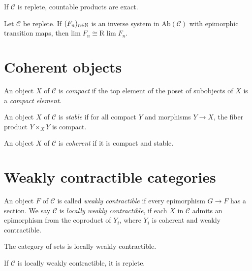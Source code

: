 \begin{proposition}
    If $\mathcal{C}$ is replete, countable products are exact.
    \label{prop:replete-products-exact}
\end{proposition}

\begin{proposition}
    Let $\mathcal{C}$ be replete.
    If $(F_n)_{n \in \mathbb{N}}$ is an inverse system in $\mathrm{Ab}(\mathcal{C})$ with
    epimorphic transition maps, then $\mathrm{lim} \; F_n \cong \mathrm{R}\; \mathrm{lim} \; F_n$.
    \label{prop:lim-exact-replete}
\end{proposition}

\section{Coherent objects}

\begin{definition}
    An object $X$ of $\mathcal{C}$ is \emph{compact} if the top element of the poset
    of subobjects of $X$ is a \emph{compact element}.
\end{definition}

\begin{definition}
    An object $X$ of $\mathcal{C}$ is \emph{stable} if for all compact $Y$ and morphisms $Y \to X$,
    the fiber product $Y \times_{X} Y$ is compact.
\end{definition}

\begin{definition}
    An object $X$ of $\mathcal{C}$ is \emph{coherent} if it is compact and stable.
    \label{def:coherent-object}
\end{definition}

\section{Weakly contractible categories}

\begin{definition}
    An object $F$ of $\mathcal{C}$ is called \emph{weakly contractible} if every epimorphism
    $G \to F$ has a section. We say $\mathcal{C}$ is \emph{locally weakly contractible},
    if each $X$ in $\mathcal{C}$ admits an epimorphism from the coproduct of $Y_i$,
    where $Y_i$ is coherent and weakly contractible.
    \label{def:lwc}
\end{definition}

\begin{example}
    The category of sets is locally weakly contractible.
\end{example}

\begin{proposition}
    If $\mathcal{C}$ is locally weakly contractible, it is replete.
    \label{prop:lwc-replete}
\end{proposition}
